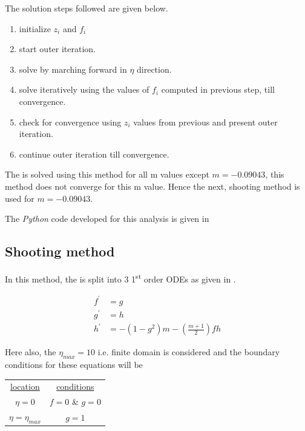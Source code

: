 The solution steps followed are given below.
\begin{enumerate}
    \item initialize \(z_i\) and \(f_i\)
    \item start outer iteration.
    \item solve  by marching forward in \(\eta\) direction.
    \item solve  iteratively using the values of \(f_i\) computed in previous step, till convergence.
    \item check for convergence using \(z_i\) values from previous and present outer iteration.
    \item continue outer iteration till convergence.\\
\end{enumerate}

\par The  is solved using this method for all m values except
\(m = -0.09043\), this method does not converge for this m value. Hence
the next, shooting method is used for \(m = -0.09043\).

\par The \emph{Python} code developed for this analysis is given in 

\subsection{Shooting method}
\par In this method, the  is split into 3 1\textsuperscript{st}
order ODEs as given in .

\begin{align}
    f^\prime &= g \label{SH_eqn1} \\
    g^\prime &= h \label{SH_eqn2} \\
    h^\prime &= -(1 - g^2) m - \left(\frac{m+1}{2}\right) f h \label{SH_eqn3}
\end{align}

\par Here also, the \(\eta_{max} = 10\) i.e. finite domain is considered and the
boundary conditions for these equations will be
\begin{table}[!h]
    \centering
    \begin{tabular}{cc}
        \underline{location} & \underline{conditions} \\
        $\eta = 0$ & $f = 0$ \& $g = 0$ \\
        $\eta = \eta_{max}$ & $g = 1$
    \end{tabular}
\end{table}

